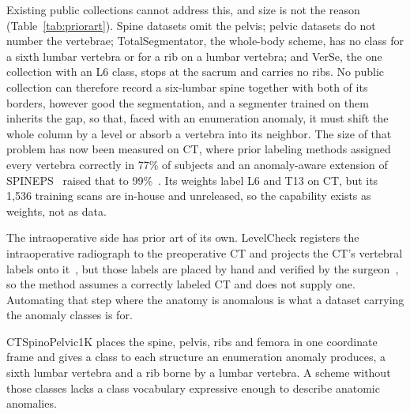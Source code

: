 \documentclass[aapm,mph,amsmath,amssymb,reprint]{revtex4-2}
\begin{document}
Existing public collections cannot address this, and size is not the reason
(Table~\ref{tab:priorart}). Spine datasets omit the pelvis; pelvic datasets do not number the
vertebrae; TotalSegmentator, the whole-body scheme, has no class for a sixth lumbar vertebra
or for a rib on a lumbar vertebra; and VerSe, the one collection with an L6 class, stops at
the sacrum and carries no ribs. No public collection can therefore record a six-lumbar spine
together with both of its borders, however good the segmentation, and a segmenter trained on
them inherits the gap, so that, faced with an enumeration anomaly, it must shift the whole column by a
level or absorb a vertebra into its neighbor. The size of that problem has now been measured
on CT, where prior labeling methods assigned every vertebra correctly in 77\% of subjects and
an anomaly-aware extension of SPINEPS~\cite{spineps2025} raised that to
99\%~\cite{veridah2026}. Its weights label L6 and T13 on CT, but its 1{,}536 training scans are in-house and unreleased, so the capability exists as weights, not as data. 

The intraoperative side has prior art of its own. LevelCheck registers the intraoperative
radiograph to the preoperative CT and projects the CT's vertebral labels onto
it~\cite{otake2012,lo2015,desilva2016}, but those labels are placed by hand and verified by
the surgeon~\cite{otake2012}, so the method assumes a correctly labeled CT and does not supply
one. Automating that step where the anatomy is anomalous is what a dataset carrying the
anomaly classes is for.

CTSpinoPelvic1K places the spine, pelvis, ribs and femora in one coordinate frame and gives
a class to each structure an enumeration anomaly produces, a sixth lumbar vertebra and a rib borne by a lumbar vertebra. A scheme without those classes lacks a class vocabulary
expressive enough to describe anatomic anomalies.
\end{document}

